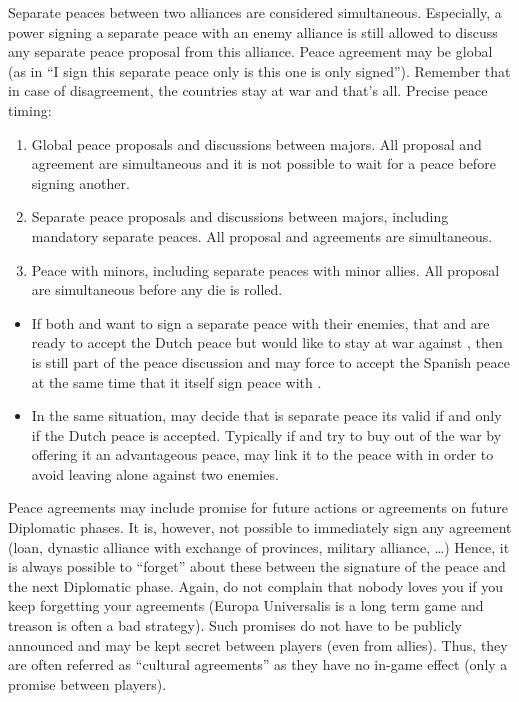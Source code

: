 Separate peaces between two alliances are considered simultaneous. Especially,
a power signing a separate peace with an enemy alliance is still allowed to
discuss any separate peace proposal from this alliance. Peace agreement may be
global (as in ``I sign this separate peace only is this one is only
signed''). Remember that in case of disagreement, the countries stay at war
and that's all.
\bparag Precise peace timing:
\begin{enumerate}
\item Global peace proposals and discussions between majors. All proposal and
  agreement are simultaneous and it is not possible to wait for a peace before
  signing another.
\item Separate peace proposals and discussions between majors, including
  mandatory separate peaces. All proposal and agreements are simultaneous.
\item Peace with minors, including separate peaces with minor allies. All
  proposal are simultaneous before any die is rolled.
\end{enumerate}

\begin{exemple}[Continued]
  \begin{itemize}
  \item If both \HOL and \HIS want to sign a separate peace with their
    enemies, that \FRA and \HIS are ready to accept the Dutch peace but \ANG
    would like to stay at war against \HIS, then \HOL is still part of the
    peace discussion and may force \ANG to accept the Spanish peace at the
    same time that it itself sign peace with \FRA.
  \item In the same situation, \HIS may decide that is separate peace its
    valid if and only if the Dutch peace is accepted. Typically if \ANG and
    \HOL try to buy \HIS out of the war by offering it an advantageous peace,
    \HIS may link it to the peace with \HOL in order to avoid leaving \FRA
    alone against two enemies.
  \end{itemize}
\end{exemple}

\bparag Peace agreements may include promise for future actions or agreements
on future Diplomatic phases.
\bparag It is, however, not possible to immediately sign any agreement (loan,
dynastic alliance with exchange of provinces, military alliance, \ldots)
Hence, it is always possible to ``forget'' about these between the signature
of the peace and the next Diplomatic phase. Again, do not complain that nobody
loves you if you keep forgetting your agreements (Europa Universalis is a long
term game and treason is often a bad strategy).
\bparag Such promises do not have to be publicly announced and may be kept
secret between players (even from allies). Thus, they are often referred as
``cultural agreements'' as they have no in-game effect (only a promise between
players). 

